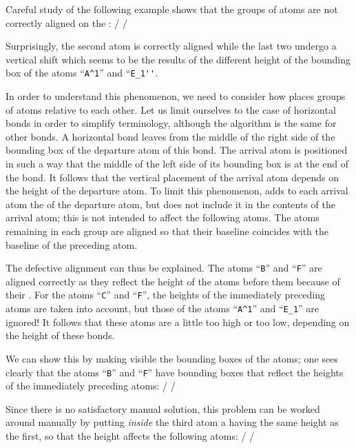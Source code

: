 \documentclass[10pt]{article}
\begin{document}
Careful study of the following example shows that the groups of atoms are not correctly aligned on the :
/\Huge\setatomsep{2em}
\qquad
{}/

Surprisingly, the second atom is correctly aligned while the last two undergo a vertical shift which seems to be the results of the different height of the bounding box of the atoms ``\verb-A^1-'' and ``\verb-E_1''-.

In order to understand this phenomenon, we need to consider how \CF places groups of atoms relative to each other. Let us limit ourselves to the case of horizontal bonds in order to simplify terminology, although the algorithm is the same for other bonds. A horizontal bond leaves from the middle of the right side of the bounding box of the departure atom of this bond. The arrival atom is positioned in such a way that the middle of the left side of its bounding box is at the end of the bond. It follows that the vertical placement of the arrival atom depends on the height of the departure atom. To limit this phenomenon, \CF adds to each arrival atom the \idx{\vphantom} of the departure atom, but does not include it in the contents of the arrival atom; this \idx{\vphantom} is not intended to affect the following atoms. The atoms remaining in each group are aligned so that their baseline coincides with the baseline of the preceding atom.

The defective alignment can thus be explained. The atoms ``\verb-B-'' and ``\verb-F-'' are aligned correctly as they reflect the height of the atoms before them because of their \idx{\vphantom}. For the atoms ``\verb-C-'' and ``\verb-F-'', the heights of the immediately preceding atoms are taken into account, but those of the atoms ``\verb-A^1-'' and ``\verb-E_1-'' are ignored! It follows that these atoms are a little too high or too low, depending on the height of these bonds.

We can show this by making visible the bounding boxes of the atoms; one sees clearly that the atoms ``\verb-B-'' and ``\verb-F-'' have bounding boxes that reflect the heights of the immediately preceding atoms:
/\Huge\setatomsep{2em}
\fboxsep=0pt
\renewcommand\printatom[1]{\fbox{\ensuremath{\mathrm#1}}}
\qquad
{}/

Since there is no satisfactory manual solution, this problem can be worked around manually by putting \emph{inside} the third atom a \idx{\vphantom} having the same height as the first, so that the height affects the following atoms:
/\Huge\setatomsep{2em}
\qquad
{}/
\end{document}
